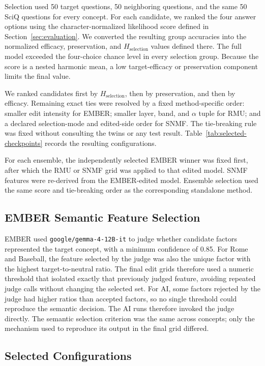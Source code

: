 Selection used 50 target questions, 50 neighboring questions, and the
same 50 SciQ questions for every concept. For each candidate, we ranked the four answer options using the
character-normalized likelihood score defined in Section~\ref{sec:evaluation}.
We converted the resulting group accuracies into the normalized efficacy,
preservation, and $H_{\mathrm{selection}}$ values defined there. The full model exceeded the four-choice
chance level in every selection group. Because the score is a nested harmonic
mean, a low target-efficacy or preservation component limits the final value.

We ranked candidates first by $H_{\mathrm{selection}}$, then by preservation,
and then by efficacy. Remaining exact ties were resolved by a fixed
method-specific order: smaller edit intensity for EMBER; smaller layer, band,
and $\alpha$ tuple for RMU; and a declared selection-mode and edited-side order
for SNMF. The tie-breaking rule was fixed without consulting the twins or any
test result. Table~\ref{tab:selected-checkpoints} records the resulting
configurations.

For each ensemble, the independently selected EMBER winner was fixed first,
after which the RMU or SNMF grid was applied to that edited model. SNMF
features were re-derived from the EMBER-edited model. Ensemble selection used
the same score and tie-breaking order as the corresponding standalone method.

\subsection{EMBER Semantic Feature Selection}
\label{app:ember-feature-selection}

EMBER used \texttt{google/gemma-4-12B-it} to judge whether candidate factors
represented the target concept, with a minimum confidence of 0.85. For Rome
and Baseball, the feature selected by the judge was also the unique factor
with the highest target-to-neutral ratio. The final edit grids therefore used
a numeric threshold that isolated exactly that previously judged feature,
avoiding repeated judge calls without changing the selected set. For AI,
some factors rejected by the judge had higher ratios than accepted factors,
so no single threshold could reproduce the semantic decision. The AI runs
therefore invoked the judge directly. The semantic selection criterion was
the same across concepts; only the mechanism used to reproduce its output in
the final grid differed.

\subsection{Selected Configurations}

